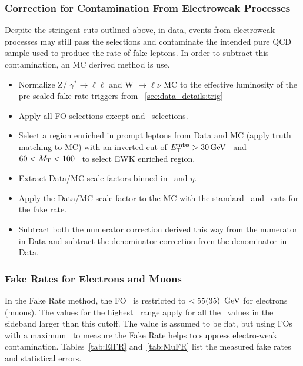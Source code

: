 		
		
		
		
		
        		\subsubsection{Correction for Contamination From Electroweak Processes}
		
		Despite the stringent cuts outlined above, in data, events from electroweak processes may still pass the selections and contaminate the intended pure QCD sample used to produce the rate of fake leptons. In order to subtract this contamination, an MC derived method is use.
\begin{itemize}
\item Normalize Z/ $\gamma ^{*} \rightarrow \ell \ell$ and W $\rightarrow \ell \nu$ MC to  the effective luminosity of the pre-scaled fake rate triggers from ~\ref{sec:data_details:trig} 
\item Apply all FO selections except \MET and \Mt \ selections.
\item Select a region enriched in prompt leptons from Data and MC (apply truth matching to MC) with an inverted cut of $E_{\mathrm{T}}^{\text{miss}} > 30 \,\text{Ge\hspace{-.08em}V}$ \ and $60 < M_{\mathrm{T}} < 100$ \ to select EWK enriched region.
\item Extract Data/MC scale factors binned in \pt \ and $\eta$.
\item Apply the Data/MC scale factor to the MC with the standard \MET \ and \Mt \ cuts for the fake rate.
\item Subtract both the numerator correction derived this way from the numerator in Data and subtract the denominator correction from the denominator in Data.
\end{itemize}
		
		
        		\subsubsection{Fake Rates for Electrons and Muons}
		In the Fake Rate method, the FO \pt \ is restricted to $< 55(35) \ \,\text{Ge\hspace{-.08em}V}$ for electrons (muons). The values for the highest \pt \ range apply for all the \pt \ values in the sideband larger than this cutoff. The value is assumed to be flat, but using FOs with a maximum \pt \ to measure the Fake Rate helps to suppress electro-weak contamination. Tables~\ref{tab:ElFR} and~\ref{tab:MuFR} list the measured fake rates and statistical errors.
		
